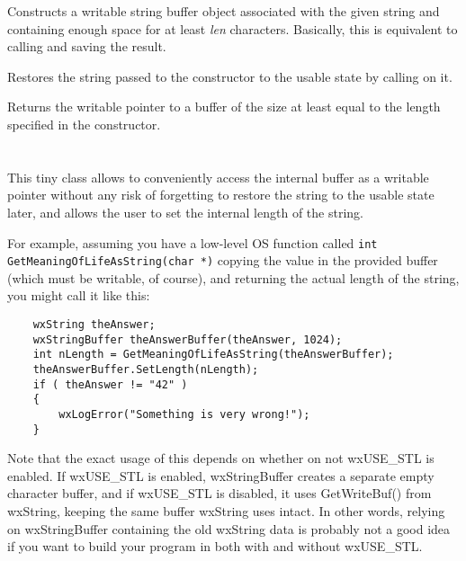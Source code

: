 \label{wxstringbufferctor}


Constructs a writable string buffer object associated with the given string
and containing enough space for at least {\it len} characters. Basically, this
is equivalent to calling  and
saving the result.


\label{wxstringbufferdtor}


Restores the string passed to the constructor to the usable state by calling 
 on it.


\label{wxstringbufferwxchar}


Returns the writable pointer to a buffer of the size at least equal to the
length specified in the constructor.



\section{}\label{wxstringbufferlength}

This tiny class allows to conveniently access the  
internal buffer as a writable pointer without any risk of forgetting to restore
the string to the usable state later, and allows the user to set the internal
length of the string.

For example, assuming you have a low-level OS function called 
{\tt int GetMeaningOfLifeAsString(char *)} copying the value in the provided
buffer (which must be writable, of course), and returning the actual length
of the string, you might call it like this:

\begin{verbatim}
    wxString theAnswer;
    wxStringBuffer theAnswerBuffer(theAnswer, 1024);
    int nLength = GetMeaningOfLifeAsString(theAnswerBuffer);
    theAnswerBuffer.SetLength(nLength);
    if ( theAnswer != "42" )
    {
        wxLogError("Something is very wrong!");
    }
\end{verbatim}

Note that the exact usage of this depends on whether on not wxUSE\_STL is enabled.  If
wxUSE\_STL is enabled, wxStringBuffer creates a separate empty character buffer, and
if wxUSE\_STL is disabled, it uses GetWriteBuf() from wxString, keeping the same buffer
wxString uses intact.  In other words, relying on wxStringBuffer containing the old 
wxString data is probably not a good idea if you want to build your program in both
with and without wxUSE\_STL.


